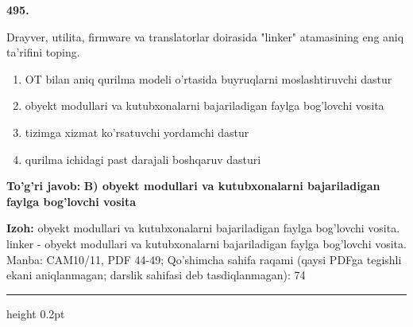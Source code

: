 \documentclass[10pt,a4paper]{article}
\begin{document}
{\bfseries\sffamily\color{ink} 495.}
\par
Drayver, utilita, firmware va translatorlar doirasida "linker" atamasining eng aniq ta'rifini toping.
\begin{enumerate}[label=\Alph*),leftmargin=9mm]
\item OT bilan aniq qurilma modeli o'rtasida buyruqlarni moslashtiruvchi dastur
\item obyekt modullari va kutubxonalarni bajariladigan faylga bog'lovchi vosita
\item tizimga xizmat ko'rsatuvchi yordamchi dastur
\item qurilma ichidagi past darajali boshqaruv dasturi
\end{enumerate}
\begin{tcolorbox}[enhanced,breakable,colback=teal!4,colframe=teal!60!black,boxrule=0.45pt,arc=1.2mm,left=2.7mm,right=2.7mm,top=1.8mm,bottom=1.8mm,before skip=2mm,after skip=2mm]
{\bfseries\sffamily\color{teal}To'g'ri javob:} \textbf{B) obyekt modullari va kutubxonalarni bajariladigan faylga bog'lovchi vosita}
\par\smallskip
{\bfseries Izoh:} obyekt modullari va kutubxonalarni bajariladigan faylga bog'lovchi vosita. linker - obyekt modullari va kutubxonalarni bajariladigan faylga bog'lovchi vosita. Manba: CAM10/11, PDF 44-49; Qo'shimcha sahifa raqami (qaysi PDFga tegishli ekani aniqlanmagan; darslik sahifasi deb tasdiqlanmagan): 74
\end{tcolorbox}
\vspace{2mm}\hrule height 0.2pt\vspace{3mm}
\end{document}
